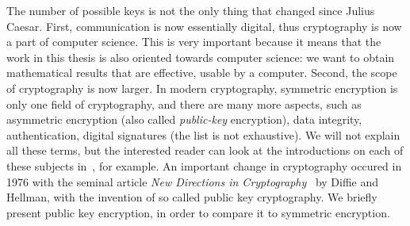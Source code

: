 The number of possible keys is not the only thing that changed since Julius
Caesar. First, communication is now essentially digital, thus cryptography is
now a part of computer science. This is very important because it means that the
work in this thesis is also oriented towards computer science: we want to obtain
mathematical results that are effective, \ie usable by a computer.
Second, the scope of cryptography is now larger.
In modern cryptography, symmetric encryption is only one field of
cryptography, and there are many more aspects, such as asymmetric
encryption (also called \emph{public-key} encryption), data integrity,
authentication, digital signatures (the list is not exhaustive). We will not
explain all these terms, but the interested reader can look at the introductions
on each of these subjects in~\cite{MVOV18}, for example. An important change in
cryptography occured in 1976 with the seminal article \emph{New Directions in
Cryptography}~\cite{DH76} by Diffie and Hellman, with the invention of so called
public key cryptography. We briefly present public key encryption, in order to
compare it to symmetric encryption.

